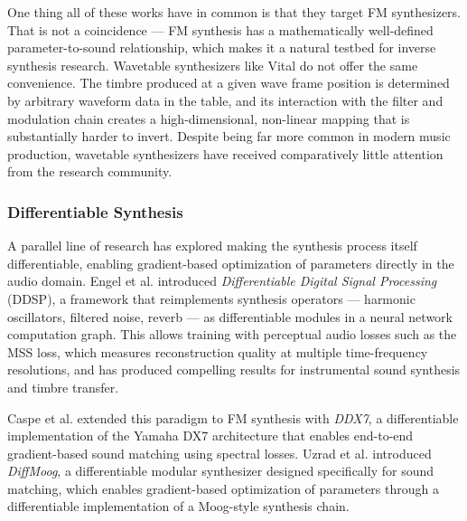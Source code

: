 \par \vspace{0.5cm}

\noindent One thing all of these works have in common is that they target FM synthesizers. That is not a coincidence --- FM synthesis has a mathematically well-defined parameter-to-sound relationship, which makes it a natural testbed for inverse synthesis research. Wavetable synthesizers like Vital do not offer the same convenience. The timbre produced at a given wave frame position is determined by arbitrary waveform data in the table, and its interaction with the filter and modulation chain creates a high-dimensional, non-linear mapping that is substantially harder to invert. Despite being far more common in modern music production, wavetable synthesizers have received comparatively little attention from the research community.

\subsubsection{Differentiable Synthesis}

A parallel line of research has explored making the synthesis process itself differentiable, enabling gradient-based optimization of parameters directly in the audio domain. Engel et al. \cite{engel2020ddsp} introduced \textit{Differentiable Digital Signal Processing} (DDSP), a framework that reimplements synthesis operators --- harmonic oscillators, filtered noise, reverb --- as differentiable modules in a neural network computation graph. This allows training with perceptual audio losses such as the MSS loss, which measures reconstruction quality at multiple time-frequency resolutions, and has produced compelling results for instrumental sound synthesis and timbre transfer.

\par \vspace{0.5cm}

\noindent Caspe et al. \cite{caspe2022ddx7} extended this paradigm to FM synthesis with \textit{DDX7}, a differentiable implementation of the Yamaha DX7 architecture that enables end-to-end gradient-based sound matching using spectral losses. Uzrad et al. \cite{diffmoog} introduced \textit{DiffMoog}, a differentiable modular synthesizer designed specifically for sound matching, which enables gradient-based optimization of parameters through a differentiable implementation of a Moog-style synthesis chain.

\par \vspace{0.5cm}

